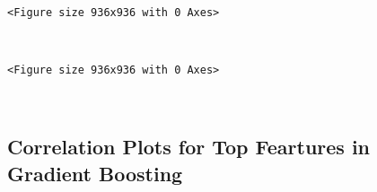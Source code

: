 \documentclass[11pt]{article}
\begin{document}
    
    \begin{center}
    \end{center}
    { \hspace*{\fill} \\}
    
    
    \begin{verbatim}
<Figure size 936x936 with 0 Axes>
    \end{verbatim}

    
    \begin{center}
    \end{center}
    { \hspace*{\fill} \\}
    
    
    \begin{verbatim}
<Figure size 936x936 with 0 Axes>
    \end{verbatim}

    
    \begin{center}
    \end{center}
    { \hspace*{\fill} \\}
    
    \hypertarget{correlation-plots-for-top-feartures-in-gradient-boosting}{%
\subsection{Correlation Plots for Top Feartures in Gradient
Boosting}\label{correlation-plots-for-top-feartures-in-gradient-boosting}}
\end{document}
